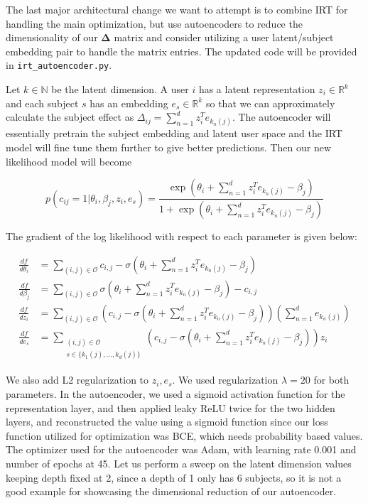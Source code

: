 \documentclass[11pt]{article}
\begin{document}
The last major architectural change we want to attempt is to combine IRT for handling the main optimization, but use autoencoders to reduce the dimensionality of our $\boldsymbol{\Delta}$ matrix and consider utilizing a user latent/subject embedding pair to handle the matrix entries. The updated code will be provided in \verb|irt_autoencoder.py|.

Let $k \in \mathbb{N}$ be the latent dimension. A user $i$ has a latent representation $z_i \in \mathbb{R}^k$ and each subject $s$ has an embedding $e_s \in \mathbb{R}^k$ so that we can approximately calculate the subject effect as $\Delta_{ij} = \sum_{n=1}^{d}z_i^Te_{k_{n}(j)}$. The autoencoder will essentially pretrain the subject embedding and latent user space and the IRT model will fine tune them further to give better predictions. 
Then our new likelihood model will become

\[
p(c_{ij} = 1 | \theta_i, \beta_j, z_i, e_s) = \frac{\exp(\theta_i + \sum_{n=1}^{d}{z_i^T}e_{k_n(j)} - \beta_j) }{1 + \exp(\theta_i + \sum_{n=1}^{d}{z_i^T}e_{k_n(j)} - \beta_j)}
\]

The gradient of the log likelihood with respect to each parameter is given below:

\begin{align*}
\frac{df}{d\theta_i} &= \sum_{(i, j) \in \mathcal{O}} c_{i,j} - \sigma(\theta_i + \sum_{n=1}^{d}{z_i^T}e_{k_n(j)} - \beta_{j}) \\
\frac{df}{d\beta_{j}} &= \sum_{(i, j) \in \mathcal{O}}{\sigma(\theta_i + \sum_{n=1}^d{z_i^T}e_{k_n(j)} - \beta_{j})} - c_{i,j} \\
\frac{df}{dz_i} &=\sum_{(i,j)\in\mathcal{O}}\left(c_{i,j}-\sigma\left(\theta_i+\sum_{n=1}^{d} z_i^T e_{k_n(j)}-\beta_j\right)\right)\left(\sum_{n=1}^{d} e_{k_n(j)}\right) \\
\frac{df}{de_s}&=\sum_{\substack{(i,j)\in\mathcal{O}\\s\in\{k_1(j),...,k_d(j)\}}}\left(c_{i,j}-\sigma\left(\theta_i+
\sum_{n=1}^{d} z_i^T e_{k_n(j)}-\beta_j\right)\right)z_i
\end{align*}

We also add L2 regularization to $z_i, e_s$. We used regularization $\lambda = 20$ for both parameters. In the autoencoder, we used a sigmoid activation function for the representation layer, and then applied leaky ReLU twice for the two hidden layers, and reconstructed the value using a sigmoid function since our loss function utilized for optimization was BCE, which needs probability based values. The optimizer used for the autoencoder was Adam, with learning rate 0.001 and number of epochs at 45. Let us perform a sweep on the latent dimension values keeping depth fixed at 2, since a depth of 1 only has 6 subjects, so it is not a good example for showcasing the dimensional reduction of our autoencoder.
\end{document}
